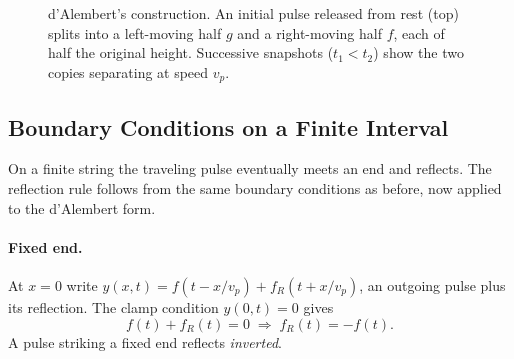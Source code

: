 \begin{figure}[ht]
\centering
{}
\caption{d'Alembert's construction. An initial pulse released from rest (top) splits into a left-moving half $g$ and a right-moving half $f$, each of half the original height. Successive snapshots ($t_1 < t_2$) show the two copies separating at speed $v_p$.}
\label{fig:dalembert}
\end{figure}

\subsection{Boundary Conditions on a Finite Interval}

On a finite string the traveling pulse eventually meets an end and reflects. The reflection rule follows from the same boundary conditions as before, now applied to the d'Alembert form.

\paragraph{Fixed end.} At $x=0$ write $y(x, t) = f(t - x/v_p) + f_R(t + x/v_p)$, an outgoing pulse plus its reflection. The clamp condition $y(0,t) = 0$ gives
\begin{equation}
    f(t) + f_R(t) = 0 \;\Longrightarrow\; f_R(t) = -f(t).
\end{equation}
A pulse striking a fixed end reflects \emph{inverted}.

